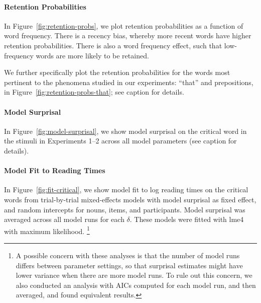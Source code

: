 \paragraph{Retention Probabilities}
In Figure~\ref{fig:retention-probs}, we plot retention probabilities as a function of word frequency.
There is a recency bias, whereby more recent words have higher retention probabilities.
There is also a word frequency effect, such that low-frequency words are more likely to be retained.

We further specifically plot the retention probabilities for the words most pertinent to the phenomena studied in our experiments: ``that'' and prepositions, in Figure~\ref{fig:retention-probs-that}; see caption for details.

\paragraph{Model Surprisal}
In Figure~\ref{fig:model-surprisal}, we show model surprisal on the critical word in the stimuli in Experiments 1--2 across all model parameters (see caption for details).




\paragraph{Model Fit to Reading Times}

In Figure~\ref{fig:fit-critical}, we show model fit to log reading times on the critical words from trial-by-trial mixed-effects models with model surprisal as fixed effect, and random intercepts for nouns, items, and participants.
Model surprisal was averaged across all model runs for each $\delta$.
These models were fitted with lme4~\citep{Bates2014FittingLM} with maximum likelihood.
\footnote{A possible concern with these analyses is that the number of model runs differs between parameter settings, so that surprisal estimates might have lower variance when there are more model runs.
To rule out this concern, we also conducted an analysis with AICs computed for each model run, and then averaged, and found equivalent results.}





